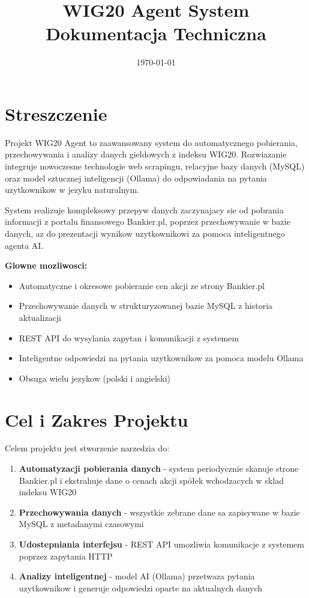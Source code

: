 \documentclass[11pt,a4paper]{article}
\title{\textbf{WIG20 Agent System} \\ \normalsize Dokumentacja Techniczna}
\author{}
\date{\today}
\begin{document}
\maketitle

\tableofcontents

\newpage

\section{Streszczenie}

Projekt WIG20 Agent to zaawansowany system do automatycznego pobierania, przechowywania i analizy danych gieldowych z indeksu WIG20. Rozwiazanie integruje nowoczesne technologie web scrapingu, relacyjne bazy danych (MySQL) oraz model sztucznej inteligencji (Ollama) do odpowiadania na pytania uzytkownikow w jezyku naturalnym.

System realizuje kompleksowy przepyw danych zaczynajacy sie od pobrania informacji z portalu finansowego Bankier.pl, poprzez przechowywanie w bazie danych, az do prezentacji wynikow uzytkownikowi za pomoca inteligentnego agenta AI.

\textbf{Glowne mozliwosci:}
\begin{itemize}
    \item Automatyczne i okresowe pobieranie cen akcji ze strony Bankier.pl
    \item Przechowywanie danych w strukturyzowanej bazie MySQL z historia aktualizacji
    \item REST API do wysylania zapytan i komunikacji z systemem
    \item Inteligentne odpowiedzi na pytania uzytkownikow za pomoca modelu Ollama
    \item Obsuga wielu jezykow (polski i angielski)
\end{itemize}

\section{Cel i Zakres Projektu}

Celem projektu jest stworzenie narzedzia do:

\begin{enumerate}
    \item \textbf{Automatyzacji pobierania danych} - system periodycznie skanuje strone Bankier.pl i ekstrahuje dane o cenach akcji spółek wchodzacych w sklad indeksu WIG20
    \item \textbf{Przechowywania danych} - wszystkie zebrane dane sa zapisywane w bazie MySQL z metadanymi czasowymi
    \item \textbf{Udostepniania interfejsu} - REST API umozliwia komunikacje z systemem poprzez zapytania HTTP
    \item \textbf{Analizy inteligentnej} - model AI (Ollama) przetwaza pytania uzytkownikow i generuje odpowiedzi oparte na aktualnych danych
\end{enumerate}
\end{document}
